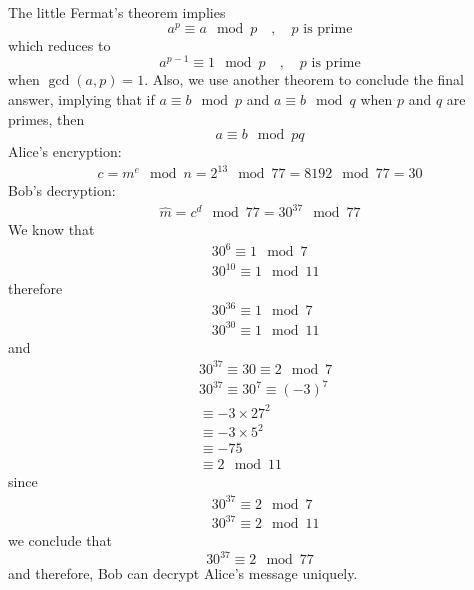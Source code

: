 \documentclass[10pt,letterpaper]{article}
\begin{document}
The little Fermat's theorem implies
$$
a^p\equiv a\mod p\quad,\quad p\text{ is prime}
$$
which reduces to
$$
a^{p-1}\equiv 1\mod p\quad,\quad p\text{ is prime}
$$
when $\gcd(a,p)=1$. Also, we use another theorem to conclude the final answer, implying that if $a\equiv b\mod p$ and $a\equiv b\mod q$ when $p$ and $q$ are primes, then
$$
a\equiv b\mod pq
$$
Alice's encryption:
\begin{equation}\begin{split}
c=m^e\mod n=2^{13}\mod 77=8192\mod 77=30
\end{split}\end{equation}
Bob's decryption:
\begin{equation}\begin{split}
\hat m=c^d\mod 77=30^{37}\mod 77
\end{split}\end{equation}
We know that
\begin{equation}\begin{split}
&30^6\equiv 1\mod 7
\\&
30^{10}\equiv 1\mod 11
\end{split}\end{equation}
therefore
\begin{equation}\begin{split}
&30^{36}\equiv 1\mod 7
\\&
30^{30}\equiv 1\mod 11
\end{split}\end{equation}
and
\begin{equation}\begin{split}
&30^{37}\equiv 30\equiv2\mod 7
\\&
30^{37}\equiv 30^7\equiv (-3)^7
\\&
\equiv -3\times 27^2
\\&
\equiv -3\times 5^2
\\&
\equiv -75
\\&
\equiv 2\mod 11
\end{split}\end{equation}
since
\begin{equation}\begin{split}
&30^{37}\equiv 2\mod 7
\\&30^{37}\equiv 2\mod 11
\end{split}\end{equation}
we conclude that
$$
30^{37}\equiv 2\mod 77
$$
and therefore, Bob can decrypt Alice's message uniquely.
\end{document}
